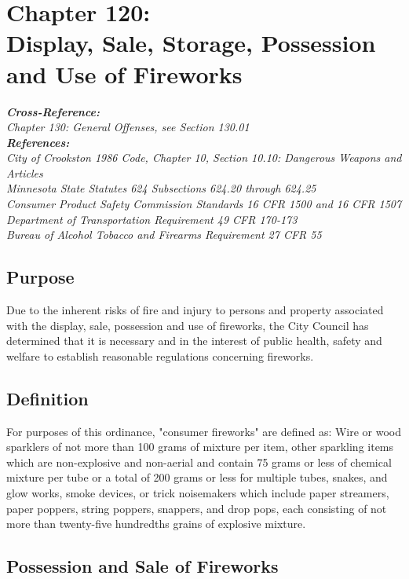 \chapter*{Chapter 120: \\
	Display, Sale, Storage, Possession and Use of Fireworks}
    \minitoc
    \emph{\textbf{Cross-Reference:}\\
        {\indent}Chapter 130: General Offenses, see Section 130.01}\\
    \emph{\textbf{References:}\\
        {\indent}City of Crookston 1986 Code, Chapter 10, Section 10.10: Dangerous Weapons and Articles\\
        {\indent}Minnesota State Statutes 624 Subsections 624.20 through 624.25\\
        {\indent}Consumer Product Safety Commission Standards 16 CFR 1500 and 16 CFR 1507\\
        {\indent}Department of Transportation Requirement 49 CFR 170-173\\
        {\indent}Bureau of Alcohol Tobacco and Firearms Requirement 27 CFR 55}
    \pagebreak

\section{Purpose}
Due to the inherent risks of fire and injury to persons and property associated with the display, sale, possession and use of fireworks, the City Council has determined that it is necessary and in the interest of public health, safety and welfare to establish reasonable regulations concerning fireworks.
\section{Definition}
For purposes of this ordinance, "consumer fireworks" are defined as: Wire or wood sparklers of not more than 100 grams of mixture per item, other sparkling items which are non-explosive and non-aerial and contain 75 grams or less of chemical mixture per tube or a total of 200 grams or less for multiple tubes, snakes, and glow works, smoke devices, or trick noisemakers which include paper streamers, paper poppers, string poppers, snappers, and drop pops, each consisting of not more than twenty-five hundredths grains of explosive mixture.
\section{Possession and Sale of Fireworks}
